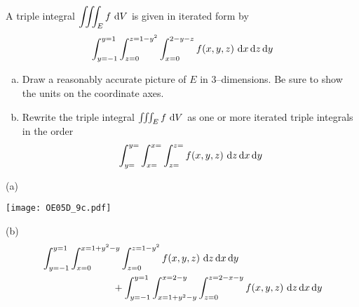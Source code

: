 \begin{question}[M200 2005D] %
A triple integral $\dst\tripInt_E f\ \dee{V}$ is given in 
iterated form by
\begin{equation*}
\int_{y=-1}^{y=1} \int_{z=0}^{z=1-y^2} \int_{x=0}^{2-y-z} f(x,y,z)
                                    \ \dee{x}\,\dee{z}\,\dee{y}
\end{equation*}
\begin{enumerate}[(a)]
\item
Draw a reasonably accurate picture of $E$ in 3--dimensions. Be sure 
to show the units on the coordinate axes.
\item
Rewrite the triple integral $\iiint_E f\ \mathrm{d}V$ as one or more 
iterated triple integrals in the order
\begin{equation*}
\int_{y=}^{y=} \int_{x=}^{x=} \int_{z=}^{z=} f(x,y,z)
                                    \ \dee{z}\,\dee{x}\,\dee{y}
\end{equation*}
\end{enumerate}
\end{question}

%

\begin{answer}
(a)
\begin{center}
     \texttt{[image: OE05D\_9c.pdf]}
\end{center}

(b)
\begin{align*}
&\int_{y=-1}^{y=1} \int_{x=0}^{x=1+y^2-y} \int_{z=0}^{z=1-y^2} f(x,y,z)
                                    \ \mathrm{d}z\,\mathrm{d}x\,\mathrm{d}y \\
&\hskip1in
+\int_{y=-1}^{y=1} \int_{x=1+y^2-y}^{x=2-y} \int_{z=0}^{z=2-x-y} f(x,y,z)
                                    \ \mathrm{d}z\,\mathrm{d}x\,\mathrm{d}y
\end{align*}
\end{answer}

